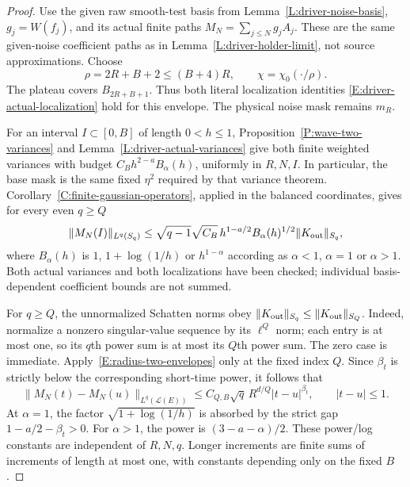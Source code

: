 \begin{proof}
  Use the given raw smooth-test basis from
  Lemma~\ref{L:driver-noise-basis}, $g_j=W(f_j)$, and its
  actual finite paths $M_N=\sum_{j\le N}g_jA_j$.
  These are the same given-noise coefficient paths as in
  Lemma~\ref{L:driver-holder-limit}, not source approximations.
  Choose
  \[
    \rho=2R+B+2\le(B+4)R,\qquad \chi=\chi_0(\cdot/\rho).
  \]
  The plateau covers $B_{2R+B+1}$.
  Thus both literal localization identities
  \eqref{E:driver-actual-localization} hold for this envelope.
  The physical noise mask remains $m_R$.

  For an interval $I\subset[0,B]$ of length $0<h\le1$,
  Proposition~\ref{P:wave-two-variances} and
  Lemma~\ref{L:driver-actual-variances} give both finite weighted
  variances with budget $C_Bh^{2-a}B_\alpha(h)$,
  uniformly in $R,N,I$.
  In particular, the base mask is the same fixed $\eta^2$
  required by that variance theorem. Corollary~\ref{C:finite-gaussian-operators},
  applied in the balanced coordinates, gives for every even $q\ge Q$
  \[
    \|M_N(I)\|_{L^q(S_q)}
    \le\sqrt{q-1}\sqrt{C_B}\,
    h^{1-a/2}B_\alpha(h)^{1/2}\|K_{\rm out}\|_{S_q},
  \]
  where $B_\alpha(h)$ is $1$, $1+\log(1/h)$ or $h^{1-\alpha}$
  according as $\alpha<1$, $\alpha=1$ or $\alpha>1$.
  Both actual variances and both localizations have been checked;
  individual basis-dependent coefficient bounds are not summed.

  For $q\ge Q$, the unnormalized Schatten norms obey
  $\|K_{\rm out}\|_{S_q}\le\|K_{\rm out}\|_{S_Q}$.
  Indeed, normalize a nonzero singular-value sequence by its
  $\ell^Q$ norm; each entry is at most one, so its $q$th power
  sum is at most its $Q$th power sum. The zero case is immediate.
  Apply~\eqref{E:radius-two-envelopes} only at the fixed index $Q$.
  Since $\beta_t$ is strictly below the corresponding short-time
  power, it follows that
  \begin{equation}\label{E:radius-finite-increment}
    \|M_N(t)-M_N(u)\|_{L^q(\mathcal L(E))}
    \le C_{Q,B}\sqrt q\,R^{d/Q}|t-u|^{\beta_t},
    \qquad |t-u|\le1.
  \end{equation}
  At $\alpha=1$, the factor $\sqrt{1+\log(1/h)}$ is absorbed
  by the strict gap $1-a/2-\beta_t>0$.
  For $\alpha>1$, the power is $(3-a-\alpha)/2$.
  These power/log constants are independent of $R,N,q$.
  Longer increments are finite sums of increments of length at
  most one, with constants depending only on the fixed $B$.


\end{proof}
